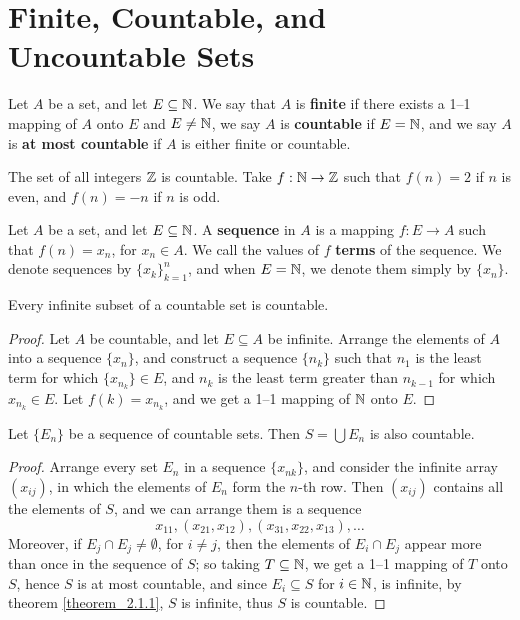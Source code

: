 \section{Finite, Countable, and Uncountable Sets}\label{section_2.1}

\begin{definition}
  Let $A$ be a set, and let  $E \subseteq \mathbb{N}$. We say that  $A$ is \textbf{finite}
  if there exists a 1--1 mapping of $A$ onto $E$ and $E \neq \mathbb{N}$, we say $A$ is
  \textbf{countable} if $E=\mathbb{N}$, and we say  $A$ is \textbf{ at most countable} if
  $A$ is either finite or countable.
\end{definition}

\begin{example}
  The set of all integers $\mathbb{Z}$ is countable. Take  $f:\mathbb{N} \rightarrow \mathbb{Z}$ such
  that $f(n)=2$ if  $n$ is even, and  $f(n)=-n$ if $n$ is odd.
\end{example}

\begin{definition}
  Let $A$ be a set, and let  $E \subseteq \mathbb{N}$. A \textbf{sequence} in  $A$ is a
  mapping $f:E \rightarrow A$ such that $f(n)=x_n$, for  $x_n \in A$. We call
  the values of  $f$ \textbf{terms} of the sequence. We denote sequences by
  $\{x_k\}_{k=1}^{n}$, and when  $E=\mathbb{N}$, we denote them simply by $\{x_n\}$.
\end{definition}

\begin{theorem}\label{theorem_2.1.1}
  Every infinite subset of a countable set is countable.
\end{theorem}
\begin{proof}
  Let $A$ be countable, and let  $E \subseteq A$ be infinite. Arrange the elements
  of  $A$ into a sequence $\{x_n\}$, and construct a sequence  $\{n_k\}$ such that
  $n_1$ is the least term for which  $\{x_{n_k}\} \in E$, and  $n_k$ is the least
  term greater than $n_{k-1}$ for which  $x_{n_k} \in E$. Let $f(k)=x_{n_k}$, and
  we get a 1--1 mapping of $\mathbb{N}$ onto  $E$.
\end{proof}

\begin{theorem}\label{theorem_2.1.2}
  Let $\{E_n\}$ be a sequence of countable sets. Then  $S=\bigcup{E_n}$ is also
  countable.
\end{theorem}
\begin{proof}
  Arrange every set $E_n$ in a sequence  $\{x_{nk}\}$, and consider the
  infinite array $(x_{ij})$, in which the elements of  $E_n$ form the
  $n$-th row. Then  $(x_{ij})$ contains all the elements of  $S$, and we can
  arrange them is a sequence
  \begin{equation*}
    x_{11}, (x_{21},x_{12}), (x_{31},x_{22},x_{13}), \dots
  \end{equation*}
  Moreover, if $E_j \cap E_j \neq \emptyset$, for  $i \neq j$, then the elements
  of $E_i \cap E_j$ appear more than once in the sequence of  $S$; so taking
  $T \subseteq \mathbb{N}$, we get a 1--1 mapping of  $T$ onto  $S$, hence  $S$ is  at
  most countable, and since $E_i \subseteq S$ for  $i \in \mathbb{N}$, is infinite, by
  theorem \ref{theorem_2.1.1},  $S$ is infinite, thus  $S$ is countable.
\end{proof}

